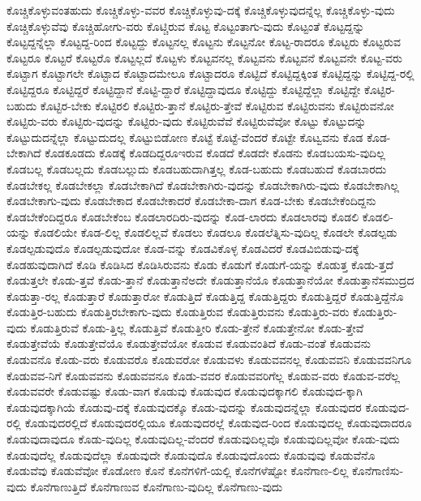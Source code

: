 {ಕೊಚ್ಚಿಕೊಳ್ಳುವಂತಹುದು
ಕೊಚ್ಚಿಕೊಳ್ಳು-ವವರ
ಕೊಚ್ಚಿಕೊಳ್ಳುವು-ದಕ್ಕೆ
ಕೊಚ್ಚಿಕೊಳ್ಳುವುದನ್ನೆಲ್ಲ
ಕೊಚ್ಚಿಕೊಳ್ಳು-ವುದು
ಕೊಚ್ಚಿಕೊಳ್ಳುವೆವು
ಕೊಚ್ಚಿಹೋಗು-ವರು
ಕೊಟ್ಚಿರುವ
ಕೊಟ್ಟ
ಕೊಟ್ಟಂತಾಗು-ವುದು
ಕೊಟ್ಟಂತೆ
ಕೊಟ್ಟದ್ದನ್ನು
ಕೊಟ್ಟದ್ದನ್ನೆಲ್ಲಾ
ಕೊಟ್ಟದ್ದ-ರಿಂದ
ಕೊಟ್ಟದ್ದು
ಕೊಟ್ಟನಲ್ಲ
ಕೊಟ್ಟನು
ಕೊಟ್ಟನೋ
ಕೊಟ್ಟ-ರಾದರೂ
ಕೊಟ್ಟರು
ಕೊಟ್ಟರುವ
ಕೊಟ್ಟರೂ
ಕೊಟ್ಟರೆ
ಕೊಟ್ಟರೊ
ಕೊಟ್ಟಲ್ಲದೆ
ಕೊಟ್ಟಳು
ಕೊಟ್ಟವನಲ್ಲ
ಕೊಟ್ಟವನು
ಕೊಟ್ಟವನೆ
ಕೊಟ್ಟವನೇ
ಕೊಟ್ಟ-ವರು
ಕೊಟ್ಟಾಗ
ಕೊಟ್ಟಾಗಲೇ
ಕೊಟ್ಟಾದ
ಕೊಟ್ಟಾದಮೇಲೂ
ಕೊಟ್ಟಾದರೂ
ಕೊಟ್ಟಿದೆ
ಕೊಟ್ಟಿದ್ದಕ್ಕಿಂತ
ಕೊಟ್ಟಿದ್ದನ್ನು
ಕೊಟ್ಟಿದ್ದ-ರಲ್ಲಿ
ಕೊಟ್ಟಿದ್ದರೂ
ಕೊಟ್ಟಿದ್ದರೆ
ಕೊಟ್ಟಿದ್ದಾನೆ
ಕೊಟ್ಟಿ-ದ್ದಾರೆ
ಕೊಟ್ಟಿದ್ದಾವುದೂ
ಕೊಟ್ಟಿದ್ದು
ಕೊಟ್ಟಿದ್ದೆಲ್ಲಾ
ಕೊಟ್ಟಿದ್ದೇ
ಕೊಟ್ಟಿರ-ಬಹುದು
ಕೊಟ್ಟಿರ-ಬೇಕು
ಕೊಟ್ಟಿರಲಿ
ಕೊಟ್ಟಿರು-ತ್ತಾನೆ
ಕೊಟ್ಟಿರು-ತ್ತೇವೆ
ಕೊಟ್ಟಿರುವ
ಕೊಟ್ಟಿರುವನು
ಕೊಟ್ಟಿರುವನೋ
ಕೊಟ್ಟಿರು-ವರು
ಕೊಟ್ಟಿರು-ವುದನ್ನು
ಕೊಟ್ಟಿರು-ವುದು
ಕೊಟ್ಟಿರುವೆವೆ
ಕೊಟ್ಟಿರುವೆವೋ
ಕೊಟ್ಟು
ಕೊಟ್ಟುದನ್ನು
ಕೊಟ್ಟುದುದನ್ನೆಲ್ಲಾ
ಕೊಟ್ಟುದುದಲ್ಲ
ಕೊಟ್ಟುಬಿಡೋಣ
ಕೊಟ್ಟೆ
ಕೊಟ್ಟೆ-ವೆಂದರೆ
ಕೊಟ್ಟೇ
ಕೊಟ್ವವನು
ಕೊಡ
ಕೊಡ-ಬೇಕಾಗಿದೆ
ಕೊಡಕೂಡದು
ಕೊಡಕ್ಕೆ
ಕೊಡದಿದ್ದರೂಇರುವ
ಕೊಡದೆ
ಕೊಡದೇ
ಕೊಡನು
ಕೊಡಬಯಸು-ವುದಿಲ್ಲ
ಕೊಡಬಲ್ಲ
ಕೊಡಬಲ್ಲದು
ಕೊಡಬಲ್ಲುದು
ಕೊಡಬಹುದಾಗಿತ್ತಲ್ಲ
ಕೊಡ-ಬಹುದು
ಕೊಡಬಹುದೆ
ಕೊಡಬಾರದು
ಕೊಡಬೇಕಲ್ಲ
ಕೊಡಬೇಕಲ್ಲಾ
ಕೊಡಬೇಕಾಗಿದೆ
ಕೊಡಬೇಕಾಗಿರು-ವುದನ್ನು
ಕೊಡಬೇಕಾಗಿರು-ವುದು
ಕೊಡಬೇಕಾಗಿಲ್ಲ
ಕೊಡಬೇಕಾಗು-ವುದು
ಕೊಡಬೇಕಾದ
ಕೊಡಬೇಕಾದರೆ
ಕೊಡಬೇಕಾ-ದಾಗ
ಕೊಡ-ಬೇಕು
ಕೊಡಬೇಕೆಂದಿದ್ದನು
ಕೊಡಬೇಕೆಂದಿದ್ದರೂ
ಕೊಡಬೇಕೆಂಬ
ಕೊಡಲಾರದಿರು-ವುದನ್ನು
ಕೊಡ-ಲಾರದು
ಕೊಡಲಾರವು
ಕೊಡಲಿ
ಕೊಡಲಿ-ಯನ್ನು
ಕೊಡಲಿಯೇ
ಕೊಡ-ಲಿಲ್ಲ
ಕೊಡಲಿಲ್ಲವೆ
ಕೊಡಲು
ಕೊಡಲೂ
ಕೊಡಲೆತ್ನಿಸು-ವುದಿಲ್ಲ
ಕೊಡಲೇ
ಕೊಡಲ್ಪಡು
ಕೊಡಲ್ಪಡುವುದೊ
ಕೊಡಲ್ಪಡುವುದೋ
ಕೊಡ-ವನ್ನು
ಕೊಡವಿಕೊಳ್ಳ
ಕೊಡವಿದರೆ
ಕೊಡವಿಬಿಡುವು-ದಕ್ಕೆ
ಕೊಡಹುವುದಾಗಿದೆ
ಕೊಡಿ
ಕೊಡಿಸಿದ
ಕೊಡಿಸಿರುವನು
ಕೊಡು
ಕೊಡುಗೆ
ಕೊಡುಗೆ-ಯನ್ನು
ಕೊಡುತ್ತ
ಕೊಡು-ತ್ತದೆ
ಕೊಡುತ್ತಲೇ
ಕೊಡು-ತ್ತವೆ
ಕೊಡು-ತ್ತಾನೆ
ಕೊಡುತ್ತಾನೆಅದೇ
ಕೊಡುತ್ತಾನೆಯೊ
ಕೊಡುತ್ತಾನೆಯೋ
ಕೊಡುತ್ತಾನೆಸಮುದ್ರದ
ಕೊಡುತ್ತಾ-ರಲ್ಲ
ಕೊಡುತ್ತಾರೆ
ಕೊಡುತ್ತಾರೋ
ಕೊಡುತ್ತಿದೆ
ಕೊಡುತ್ತಿದ್ದ
ಕೊಡುತ್ತಿದ್ದರು
ಕೊಡುತ್ತಿದ್ದರೆ
ಕೊಡುತ್ತಿದ್ದೆನೊ
ಕೊಡುತ್ತಿರ-ಬಹುದು
ಕೊಡುತ್ತಿರಬೇಕಾಗು-ವುದು
ಕೊಡುತ್ತಿರುವ
ಕೊಡುತ್ತಿರುವನು
ಕೊಡುತ್ತಿರು-ವರು
ಕೊಡುತ್ತಿರು-ವುದು
ಕೊಡುತ್ತಿರುವೆ
ಕೊಡು-ತ್ತಿಲ್ಲ
ಕೊಡುತ್ತಿವೆ
ಕೊಡುತ್ತೀರಿ
ಕೊಡು-ತ್ತೇನೆ
ಕೊಡುತ್ತೇನೋ
ಕೊಡು-ತ್ತೇವೆ
ಕೊಡುತ್ತೇವೆಯೆ
ಕೊಡುತ್ತೇವೆಯೊ
ಕೊಡುತ್ತೇವೆಯೋ
ಕೊಡುವ
ಕೊಡುವಂತಿದೆ
ಕೊಡು-ವಂತೆ
ಕೊಡುವನು
ಕೊಡುವನೊ
ಕೊಡು-ವರು
ಕೊಡುವರೊ
ಕೊಡುವರೋ
ಕೊಡುವಳು
ಕೊಡುವವನಲ್ಲ
ಕೊಡುವವನಿ
ಕೊಡುವವನಿಗೂ
ಕೊಡುವವ-ನಿಗೆ
ಕೊಡುವವನು
ಕೊಡುವವನೂ
ಕೊಡು-ವವರ
ಕೊಡುವವರಿಗೆಲ್ಲ
ಕೊಡುವ-ವರು
ಕೊಡುವ-ವರೆಲ್ಲ
ಕೊಡುವವರೇ
ಕೊಡುವಷ್ಟು
ಕೊಡು-ವಾಗ
ಕೊಡುವು
ಕೊಡುವುದ
ಕೊಡುವುದಕ್ಕಾಗಲಿ
ಕೊಡುವುದ-ಕ್ಕಾಗಿ
ಕೊಡುವುದಕ್ಕಾಗಿಯೆ
ಕೊಡುವು-ದಕ್ಕೆ
ಕೊಡುವುದಕ್ಕೊ
ಕೊಡು-ವುದನ್ನು
ಕೊಡುವುದನ್ನೆಲ್ಲಾ
ಕೊಡುವುದರ
ಕೊಡುವುದ-ರಲ್ಲಿ
ಕೊಡುವುದರಲ್ಲಿದೆ
ಕೊಡುವುದರಲ್ಲಿಯೂ
ಕೊಡುವುದರಲ್ಲೆ
ಕೊಡುವುದ-ರಿಂದ
ಕೊಡುವುದಲ್ಲ
ಕೊಡುವುದಾದರೂ
ಕೊಡುವುದಾವುದೂ
ಕೊಡು-ವುದಿಲ್ಲ
ಕೊಡುವುದಿಲ್ಲ-ವೆಂದರೆ
ಕೊಡುವುದಿಲ್ಲವೊ
ಕೊಡುವುದಿಲ್ಲವೋ
ಕೊಡು-ವುದು
ಕೊಡುವುದೆಲ್ಲ
ಕೊಡುವುದೆಲ್ಲಾ
ಕೊಡುವುದೇ
ಕೊಡುವುದೊ
ಕೊಡುವುದೊಂದು
ಕೊಡುವುವು
ಕೊಡುವೆನೊ
ಕೊಡುವೆವು
ಕೊಡುವೆವೋ
ಕೊಡೋಣ
ಕೊನೆ
ಕೊನೆಗಳಿಗೆ-ಯಲ್ಲಿ
ಕೊನೆಗಳೆಷ್ಟೋ
ಕೊನೆಗಾಣ-ಲಿಲ್ಲ
ಕೊನೆಗಾಣಿಸು-ವುದು
ಕೊನೆಗಾಣುತ್ತಿದೆ
ಕೊನೆಗಾಣುವ
ಕೊನೆಗಾಣು-ವುದಿಲ್ಲ
ಕೊನೆಗಾಣು-ವುದು
}
